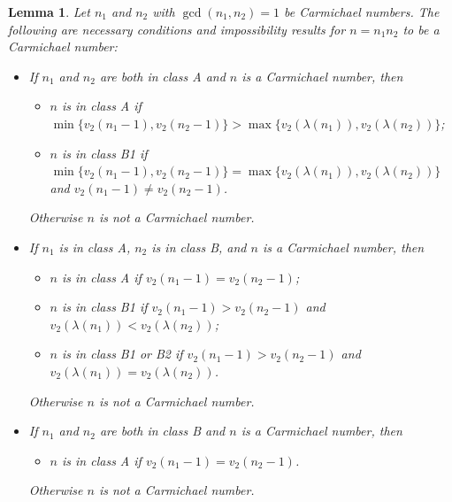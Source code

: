 \documentclass[runningheads]{amsart}
\newtheorem{lemma}[theorem]{Lemma}
\begin{document}
\begin{lemma}\label{le:classification-products}
Let
$n_1$
and
$n_2$
with
$\gcd(n_1,n_2)=1$
be Carmichael numbers.
The following are necessary conditions and impossibility results for $n =
n_1
n_2$
to be a Carmichael number:
\begin{itemize}
\item If $n_1$ and $n_2$ are both in class A and $n$ is a Carmichael number, then
\begin{itemize}
\item $n$ is in class A if $\min\{v_2(n_1 - 1), v_2(n_2-1)\} > \max\{v_2(\lambda(n_1)), v_2(\lambda(n_2))\}$;
\item $n$ is in class B1 if  $ \min\{v_2(n_1 - 1), v_2(n_2-1)\} = \max\{v_2(\lambda(n_1)), v_2(\lambda(n_2))\}$ and $v_2(n_1 - 1) \neq v_2(n_2-1)$.
\end{itemize}
Otherwise $n$ is not a Carmichael number.
\item If $n_1$ is in class A, $n_2$ is in class B, and $n$ is a Carmichael number, then
\begin{itemize}
\item $n$ is in class A if $v_2(n_1 - 1) = v_2(n_2-1)$;
\item $n$ is in class B1 if $v_2(n_1 - 1) > v_2(n_2-1)$ and
$v_2(\lambda(n_1))<
v_2(\lambda(n_2))$;
\item $n$ is in class B1 or B2 if $v_2(n_1 - 1) > v_2(n_2-1)$ and
$v_2(\lambda(n_1))=
v_2(\lambda(n_2))$.
\end{itemize}
Otherwise $n$ is not a Carmichael number.
\item If $n_1$ and $n_2$ are both in class B and $n$ is a Carmichael number, then
\begin{itemize}
\item $n$ is in class A if $v_2(n_1 - 1) = v_2(n_2-1)$.
\end{itemize}
Otherwise $n$ is not a Carmichael number.
\end{itemize}
\end{lemma}
\end{document}
